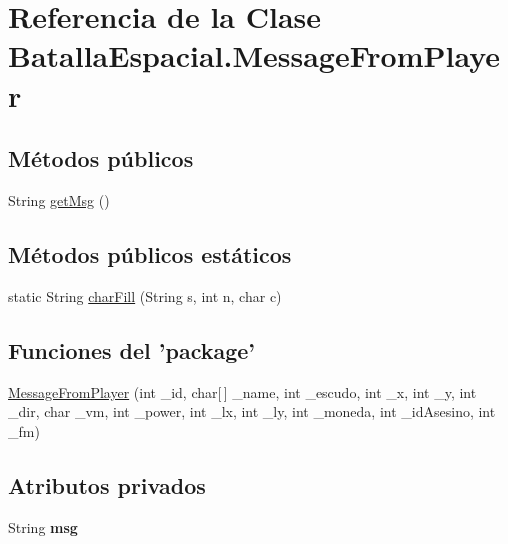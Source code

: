 \hypertarget{classBatallaEspacial_1_1MessageFromPlayer}{
\section{Referencia de la Clase BatallaEspacial.MessageFromPlayer}
\label{classBatallaEspacial_1_1MessageFromPlayer}
}
\subsection*{Métodos públicos}
\begin{DoxyCompactItemize}
\item 
String \hyperlink{classBatallaEspacial_1_1MessageFromPlayer_a8e7ff2f90816afb286c77e9fecd7754d}{getMsg} ()
\end{DoxyCompactItemize}
\subsection*{Métodos públicos estáticos}
\begin{DoxyCompactItemize}
\item 
static String \hyperlink{classBatallaEspacial_1_1MessageFromPlayer_af8e32dfb2d1d3d16ce4759b7c7fb7585}{charFill} (String s, int n, char c)
\end{DoxyCompactItemize}
\subsection*{Funciones del 'package'}
\begin{DoxyCompactItemize}
\item 
\hyperlink{classBatallaEspacial_1_1MessageFromPlayer_a0726f0c83695518df2d73a7a74c65853}{MessageFromPlayer} (int \_\-id, char\mbox{[}$\,$\mbox{]} \_\-name, int \_\-escudo, int \_\-x, int \_\-y, int \_\-dir, char \_\-vm, int \_\-power, int \_\-lx, int \_\-ly, int \_\-moneda, int \_\-idAsesino, int \_\-fm)
\end{DoxyCompactItemize}
\subsection*{Atributos privados}
\begin{DoxyCompactItemize}
\item 
\hypertarget{classBatallaEspacial_1_1MessageFromPlayer_afee8010406a5937e9900d38fc9142970}{
String {\bfseries msg}}
\label{classBatallaEspacial_1_1MessageFromPlayer_afee8010406a5937e9900d38fc9142970}

\end{DoxyCompactItemize}


